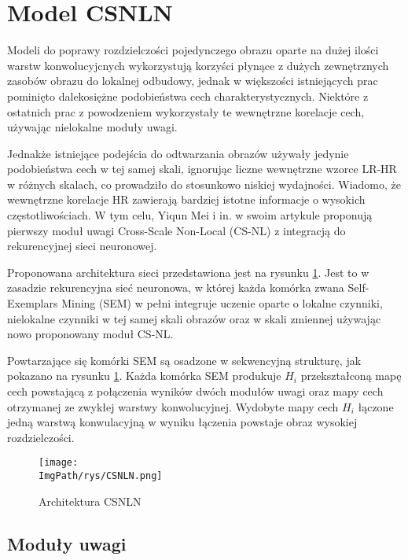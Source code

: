 \documentclass[a4paper,12pt,twoside,openany]{report}
\newcommand{\ImgPath}{.}
\begin{document}
\section{Model CSNLN}
	\label{ModelCSNLN}
	Modeli do poprawy rozdzielczości pojedynczego obrazu oparte na dużej ilości warstw konwolucyjcnych wykorzystują korzyści płynące z dużych zewnętrznych zasobów obrazu do lokalnej odbudowy, jednak w większości istniejących prac pominięto dalekosiężne podobieństwa cech charakterystycznych. Niektóre z ostatnich prac z powodzeniem wykorzystały te wewnętrzne korelacje cech, używając nielokalne moduły uwagi.
	
	Jednakże istniejące podejścia do odtwarzania obrazów używały jedynie podobieństwa cech w tej samej skali, ignorując liczne wewnętrzne wzorce LR-HR w różnych skalach, co prowadziło do stosunkowo niskiej wydajności. Wiadomo, że wewnętrzne korelacje HR zawierają bardziej istotne informacje o wysokich częstotliwościach. W tym celu,  Yiqun Mei i in. w swoim artykule \cite{CSNLN} proponują pierwszy moduł uwagi Cross-Scale Non-Local (CS-NL) z integracją do rekurencyjnej sieci neuronowej. 
	
	Proponowana architektura sieci przedstawiona jest na rysunku \ref{CSNLN}. Jest to w zasadzie rekurencyjna sieć neuronowa, w której każda komórka zwana Self-Exemplars Mining (SEM) w pełni integruje uczenie oparte o lokalne czynniki, nielokalne czynniki w tej samej skali obrazów oraz w skali zmiennej używając nowo proponowany moduł CS-NL.
	
	Powtarzające się komórki SEM są osadzone w sekwencyjną strukturę, jak pokazano na rysunku \ref{CSNLN}. Każda komórka SEM produkuje $H_i$ przekształconą mapę cech powstającą z połączenia wyników dwóch modułów uwagi oraz mapy cech otrzymanej ze zwykłej warstwy konwolucyjnej. Wydobyte mapy cech $H_i$ łączone jedną warstwą konwulacyjną w wyniku łączenia powstaje obraz wysokiej rozdzielczości.
	
	\begin{figure}[!htbp]
		\begin{center}
			\centering
			\texttt{[image: \\ImgPath/rys/CSNLN.png]}
		\end{center}
		\caption{Architektura CSNLN}
		\label{CSNLN}
	\end{figure}
	\subsection{Moduły uwagi}
	
\end{document}
